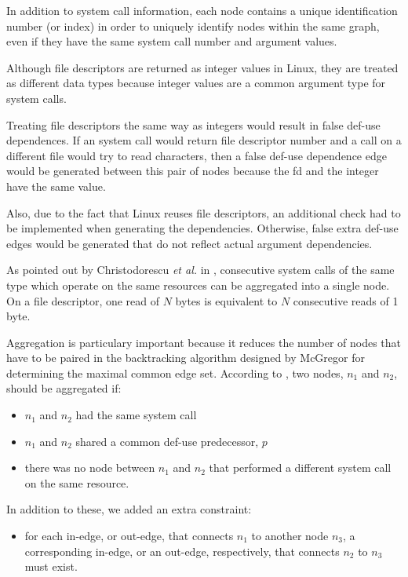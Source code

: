 In addition to system call information, each node contains a unique identification number (or index) in order to uniquely identify nodes within the same graph, even if they have the same system call number and argument values.

Although file descriptors are returned as integer values in Linux, they are treated as different data types because integer values are a common argument type for system calls. 

Treating file descriptors the same way as integers would result in false def-use dependences. If an  system call would return file descriptor number  and a  call on a different file would try to read  characters, then a false def-use dependence edge would be generated between this pair of nodes because the fd and the integer have the same value.

Also, due to the fact that Linux reuses file descriptors, an additional check had to be implemented when generating the dependencies. Otherwise, false extra def-use edges would be generated that do not reflect actual argument dependencies.

As pointed out by Christodorescu \textit{et al.} in \cite{mining-specifications}, consecutive system calls of the same type which operate on the same resources can be aggregated into a single node. On a file descriptor, one read of $N$ bytes is equivalent to $N$ consecutive reads of 1 byte.

Aggregation is particulary important because it reduces the number of nodes that have to be paired in the backtracking algorithm designed by McGregor for determining the maximal common edge set. According to \cite{mining-specifications}, two nodes, $n_1$ and $n_2$, should be aggregated if:

\begin{itemize}
	\item $n_1$ and $n_2$ had the same system call
	\item $n_1$ and $n_2$ shared a common def-use predecessor, $p$
	\item there was no node between $n_1$ and $n_2$ that performed a different system call on the same resource.
\end{itemize}

In addition to these, we added an extra constraint:

\begin{itemize}
	\item for each in-edge, or out-edge, that connects $n_1$ to another node $n_3$, a corresponding in-edge, or an out-edge, respectively, that connects $n_2$ to $n_3$ must exist.
\end{itemize}


